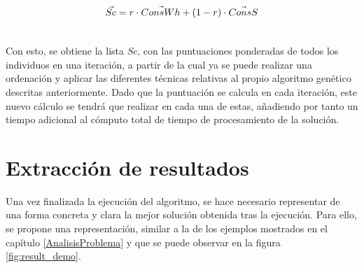 \documentclass[11pt,spanish,listoffigures,listoftables]{tfgetsinf}
\begin{document}
\begin{align}
    \Vec{Sc} = r \cdot \Vec{ConsWh} + (1-r) \cdot \Vec{ConsS} \\\notag
\end{align}
    
Con esto, se obtiene la lista $Sc$, con las puntuaciones ponderadas de todos los individuos en una iteración, a partir de la cual ya se puede realizar una ordenación y aplicar las diferentes técnicas relativas al propio algoritmo genético descritas anteriormente. Dado que la puntuación se calcula en cada iteración, este nuevo cálculo se tendrá que realizar en cada una de estas, añadiendo por tanto un tiempo adicional al cómputo total de tiempo de procesamiento de la solución.

\newpage
\section{Extracción de resultados}
\label{results_visualization}
Una vez finalizada la ejecución del algoritmo, se hace necesario representar de una forma concreta y clara la mejor solución obtenida tras la ejecución. Para ello, se propone una representación, similar a la de los ejemplos mostrados en el capítulo \ref{AnalisisProblema} y que se puede observar en la figura \ref{fig:result_demo}.
\end{document}

